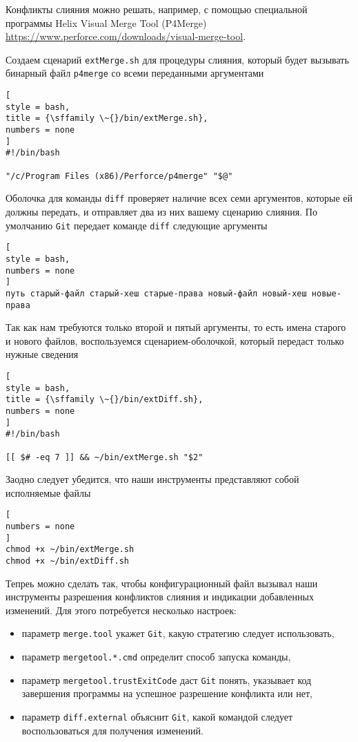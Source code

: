 \documentclass[%
	11pt,
	a4paper,
	utf8,
		]{article}
\begin{document}
Конфликты слияния можно решать, например, с помощью специальной программы Helix Visual Merge Tool (P4Merge) \url{https://www.perforce.com/downloads/visual-merge-tool}.

Создаем сценарий \texttt{extMerge.sh} для процедуры слияния, который будет вызывать бинарный файл \texttt{p4merge} со всеми переданными аргументами
\begin{lstlisting}[
style = bash,
title = {\sffamily \~{}/bin/extMerge.sh},
numbers = none
]
#!/bin/bash

"/c/Program Files (x86)/Perforce/p4merge" "$@"
\end{lstlisting}

Оболочка для команды \texttt{diff} проверяет наличие всех семи аргументов, которые ей должны передать, и отправляет два из них вашему сценарию слияния. По умолчанию \texttt{Git} передает команде \texttt{diff} следующие аргументы
\begin{lstlisting}[
style = bash,
numbers = none
]
путь старый-файл старый-хеш старые-права новый-файл новый-хеш новые-права
\end{lstlisting}

Так как нам требуются только второй и пятый аргументы, то есть имена старого и нового файлов, воспользуемся сценарием-оболочкой, который передаст только нужные сведения
\begin{lstlisting}[
style = bash,
title = {\sffamily \~{}/bin/extDiff.sh},
numbers = none
]
#!/bin/bash

[[ $# -eq 7 ]] && ~/bin/extMerge.sh "$2" 
\end{lstlisting}

Заодно следует убедится, что наши инструменты представляют собой исполняемые файлы
\begin{lstlisting}[
numbers = none
]
chmod +x ~/bin/extMerge.sh
chmod +x ~/bin/extDiff.sh
\end{lstlisting}

Тепреь можно сделать так, чтобы конфигурационный файл вызывал наши инструменты разрешения конфликтов слияния и индикации добавленных изменений. Для этого потребуется несколько настроек:
\begin{itemize}
	\item параметр \verb|merge.tool| укажет \texttt{Git}, какую стратегию следует использовать,
	
	\item параметр \verb|mergetool.*.cmd| определит способ запуска команды,
	
	\item параметр \verb|mergetool.trustExitCode| даст \texttt{Git} понять, указывает код завершения программы на успешное разрешение конфликта или нет, 
	
	\item параметр \texttt{diff.external} объяснит \texttt{Git}, какой командой  следует воспользоваться для получения изменений.
\end{itemize}
\end{document}
